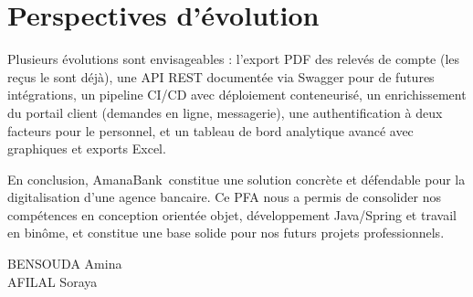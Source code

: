 \documentclass[11pt,a4paper,oneside]{report}
\newcommand{\etudianteun}{BENSOUDA Amina}
\newcommand{\etudiantedeux}{AFILAL Soraya}
\newcommand{\nomapplication}{AmanaBank}
\begin{document}
\section*{Perspectives d'évolution}

Plusieurs évolutions sont envisageables : l'export PDF des relevés de compte (les reçus le sont déjà), une API REST documentée via Swagger pour de futures intégrations, un pipeline CI/CD avec déploiement conteneurisé, un enrichissement du portail client (demandes en ligne, messagerie), une authentification à deux facteurs pour le personnel, et un tableau de bord analytique avancé avec graphiques et exports Excel.

\vspace{0.5cm}
En conclusion, \nomapplication\ constitue une solution concrète et défendable pour la digitalisation d'une agence bancaire. Ce PFA nous a permis de consolider nos compétences en conception orientée objet, développement Java/Spring et travail en binôme, et constitue une base solide pour nos futurs projets professionnels.

\vspace{1cm}
\begin{flushright}
    \etudianteun\\
    \etudiantedeux
\end{flushright}
\end{document}
